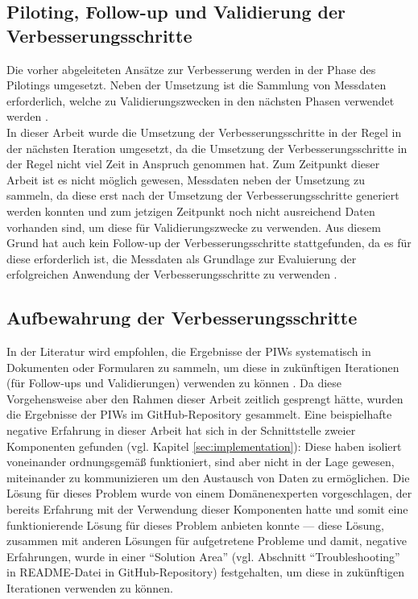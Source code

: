 \subsection{Piloting, Follow-up und Validierung der Verbesserungsschritte}
Die vorher abgeleiteten Ansätze zur Verbesserung werden in der Phase des Pilotings umgesetzt. Neben der Umsetzung ist die Sammlung von Messdaten erforderlich, welche zu Validierungszwecken in den nächsten Phasen verwendet werden \cite{salo2007iterative}. \\ In dieser Arbeit wurde die Umsetzung der Verbesserungsschritte in der Regel in der nächsten Iteration umgesetzt, da die Umsetzung der Verbesserungsschritte in der Regel nicht viel Zeit in Anspruch genommen hat. Zum Zeitpunkt dieser Arbeit ist es nicht möglich gewesen, Messdaten neben der Umsetzung zu sammeln, da diese erst nach der Umsetzung der Verbesserungsschritte generiert werden konnten und zum jetzigen Zeitpunkt noch nicht ausreichend Daten vorhanden sind, um diese für Validierungszwecke zu verwenden. Aus diesem Grund hat auch kein Follow-up der Verbesserungsschritte stattgefunden, da es für diese erforderlich ist, die Messdaten als Grundlage zur Evaluierung der erfolgreichen Anwendung der Verbesserungsschritte zu verwenden \cite{salo2007iterative}. 

\subsection{Aufbewahrung der Verbesserungsschritte}
In der Literatur wird empfohlen, die Ergebnisse der PIWs systematisch in Dokumenten oder Formularen zu sammeln, um diese in zukünftigen Iterationen (für Follow-ups und Validierungen) verwenden zu können \cite{salo2007iterative}. Da diese Vorgehensweise aber den Rahmen dieser Arbeit zeitlich gesprengt hätte, wurden die Ergebnisse der PIWs im GitHub-Repository gesammelt. Eine beispielhafte negative Erfahrung in dieser Arbeit hat sich in der Schnittstelle zweier Komponenten gefunden (vgl. Kapitel \ref{sec:implementation}): Diese haben isoliert voneinander ordnungsgemäß funktioniert, sind aber nicht in der Lage gewesen, miteinander zu kommunizieren um den Austausch von Daten zu ermöglichen. Die Lösung für dieses Problem wurde von einem Domänenexperten vorgeschlagen, der bereits Erfahrung mit der Verwendung dieser Komponenten hatte und somit eine funktionierende Lösung für dieses Problem anbieten konnte --- diese Lösung, zusammen mit anderen Lösungen für aufgetretene Probleme und damit, negative Erfahrungen, wurde in einer \enquote{Solution Area} (vgl. Abschnitt \enquote{Troubleshooting} in README-Datei in GitHub-Repository) festgehalten, um diese in zukünftigen Iterationen verwenden zu können. 